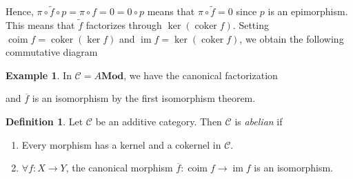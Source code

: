 \documentclass{article}
\newcommand{\cat}{\mathcal{C}}
\newcommand{\Mod}{\mathbf{Mod}}
\DeclareMathOperator{\coker}{coker}
\DeclareMathOperator{\im}{im}
\DeclareMathOperator{\coim}{coim}
\theoremstyle{plain}
\theoremstyle{definition}
\newtheorem{definition}[theorem]{Definition}
\newtheorem{example}[theorem]{Example}
\theoremstyle{remark}
\begin{document}
Hence, $\pi \circ \tilde{f} \circ p = \pi \circ f = 0 = 0 \circ p$ means that $\pi \circ \tilde{f} = 0$ since $p$ is an epimorphism. This means that $\tilde{f}$ factorizes through $\ker(\coker f)$. Setting $\coim f = \coker(\ker f)$ and $\im f = \ker(\coker f)$, we obtain the following commutative diagram
\begin{center}
\end{center}

\begin{example}
    In $\cat = A\Mod$, we have the canonical factorization
    \begin{center}
    \end{center}
    and $\overline{f}$ is an isomorphism by the first isomorphism theorem.
\end{example}

\begin{definition}
    Let $\cat$ be an additive category. Then $\cat$ is \emph{abelian} if
    \begin{enumerate}
        \item Every morphism has a kernel and a cokernel in $\cat$.
        \item $\forall f : X \to Y$, the canonical morphism $\overline{f} : \coim f \to \im f$ is an isomorphism.
    \end{enumerate}
\end{definition}
\end{document}
